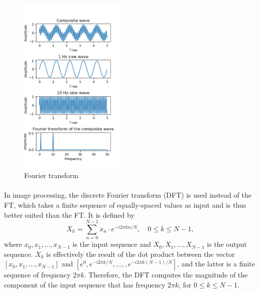 \documentclass[12pt, twocolumn]{report}
\begin{document}
\begin{figure}[htbp]
    \centering
    \includegraphics[width=0.45\textwidth]{Figures/FT demonstration.png}
    \caption{Fourier transform}
    \label{FT demonstration}
\end{figure}

\paragraph{}
In image processing, the discrete Fourier transform (DFT) is used instead of the FT, which takes a finite sequence of equally-spaced values as input and is thus better suited than the FT. It is defined by
\begin{equation}
    X_k = \sum_{n=0}^{N-1} x_n \cdot e^{-i2\pi kn/N}, \quad 0 \leq k \leq N-1,
    \label{FT DFT}
\end{equation}
where $x_0,x_1,...,x_{N-1}$ is the input sequence and $X_0,X_1,...,X_{N-1}$ is the output sequence. $X_k$ is effectively the result of the dot product between the vector $[x_0,x_1,...,x_{N-1}]$ and $[e^0,e^{-i2\pi k/N},...,,e^{-i2\pi k(N-1)/N}]$, and the latter is a finite sequence of frequency $2\pi k$. Therefore, the DFT computes the magnitude of the component of the input sequence that has frequency $2\pi k$, for $0 \leq k \leq N-1$.
\end{document}
